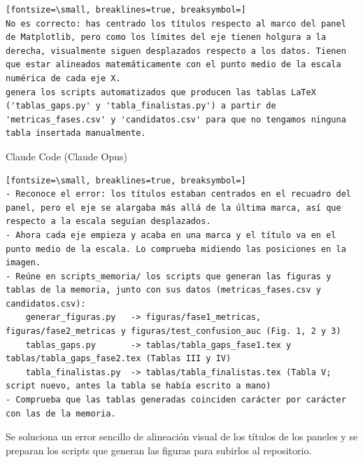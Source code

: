 \documentclass[12pt,a4paper,oneside]{book}
\begin{document}
\begin{iaprompt}
\begin{iaprompt}
\begin{Verbatim}[fontsize=\small, breaklines=true, breaksymbol=]
No es correcto: has centrado los títulos respecto al marco del panel de Matplotlib, pero como los límites del eje tienen holgura a la derecha, visualmente siguen desplazados respecto a los datos. Tienen que estar alineados matemáticamente con el punto medio de la escala numérica de cada eje X. 
genera los scripts automatizados que producen las tablas LaTeX ('tablas_gaps.py' y 'tabla_finalistas.py') a partir de 'metricas_fases.csv' y 'candidatos.csv' para que no tengamos ninguna tabla insertada manualmente.
\end{Verbatim}
\end{iaprompt}
\begin{iaresp}{Claude Code (Claude Opus)}
\begin{Verbatim}[fontsize=\small, breaklines=true, breaksymbol=]
- Reconoce el error: los títulos estaban centrados en el recuadro del panel, pero el eje se alargaba más allá de la última marca, así que respecto a la escala seguían desplazados.
- Ahora cada eje empieza y acaba en una marca y el título va en el punto medio de la escala. Lo comprueba midiendo las posiciones en la imagen.
- Reúne en scripts_memoria/ los scripts que generan las figuras y tablas de la memoria, junto con sus datos (metricas_fases.csv y candidatos.csv):
    generar_figuras.py   -> figuras/fase1_metricas, figuras/fase2_metricas y figuras/test_confusion_auc (Fig. 1, 2 y 3)
    tablas_gaps.py       -> tablas/tabla_gaps_fase1.tex y tablas/tabla_gaps_fase2.tex (Tablas III y IV)
    tabla_finalistas.py  -> tablas/tabla_finalistas.tex (Tabla V; script nuevo, antes la tabla se había escrito a mano)
- Comprueba que las tablas generadas coinciden carácter por carácter con las de la memoria.
\end{Verbatim}
\end{iaresp}
\begin{iaanalisis}
Se soluciona un error sencillo de alineación visual de los títulos de los paneles y se preparan los scripts que generan las figuras para subirlos al repositorio.
\end{iaanalisis}




\end{iaprompt}
\end{document}
